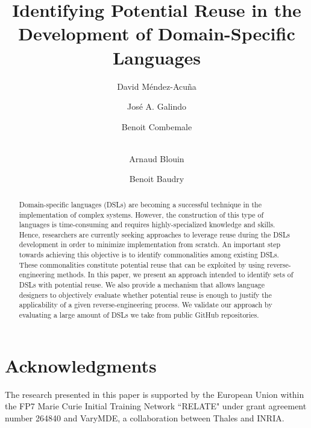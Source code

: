\documentclass[runningheads,a4paper]{llncs}
\begin{document}
\mainmatter  %

\title{Identifying Potential Reuse in the Development of Domain-Specific Languages}


\author{David M\'endez-Acu\~na \and Jos\'e A. Galindo \and Benoit Combemale \and \\ Arnaud Blouin \and Benoit Baudry}

\maketitle

\begin{abstract} 

Domain-specific languages (DSLs) are becoming a successful technique in the implementation of complex systems. However, the construction of this type of languages is time-consuming and requires highly-specialized knowledge and skills. Hence, researchers are currently seeking approaches to leverage reuse during the DSLs development in order to minimize implementation from scratch. An important step towards achieving this objective is to identify commonalities among existing DSLs. These commonalities constitute potential reuse that can be exploited by using reverse-engineering methods. In this paper, we present an approach intended to identify sets of DSLs with potential reuse. We also provide a mechanism that allows language designers to objectively evaluate whether potential reuse is enough to justify the applicability of a given reverse-engineering process. We validate our approach by evaluating a large amount of DSLs we take from public GitHub repositories.

\end{abstract}


%
%
%
%
%
%
%
%

\section*{Acknowledgments}
The research presented in this paper is supported by the European Union within the FP7 Marie Curie Initial Training Network ``RELATE" under grant agreement number 264840 and VaryMDE, a collaboration between Thales and INRIA.



\end{document}
